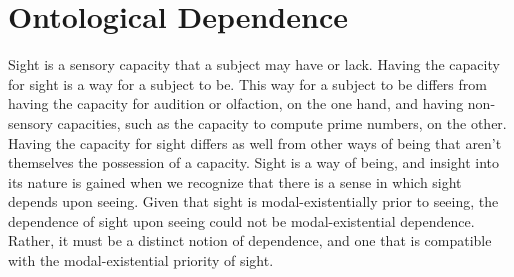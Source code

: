 \documentclass[12pt]{article}
\begin{document}

\section{Ontological Dependence} %
\label{sec:ontological_dependence}

Sight is a sensory capacity that a subject may have or lack. Having the capacity for sight is a way for a subject to be. This way for a subject to be differs from having the capacity for audition or olfaction, on the one hand, and having non-sensory capacities, such as the capacity to compute prime numbers, on the other. Having the capacity for sight differs as well from other ways of being that aren't themselves the possession of a capacity. Sight is a way of being, and insight into its nature is gained when we recognize that there is a sense in which sight depends upon seeing. Given that sight is modal-existentially prior to seeing, the dependence of sight upon seeing could not be modal-existential dependence. Rather, it must be a distinct notion of dependence, and one that is compatible with the modal-existential priority of sight.
\end{document}
